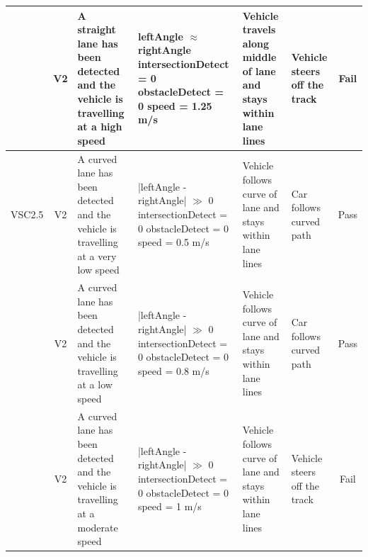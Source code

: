 \documentclass [10pt]{article}
\begin{document}
\begin{longtable}{ | p{ } | p{ } |  p{ } |  p{ } | p{ } | p{ } |  p{ } |}
    \rowcolor{tableCell}\multicolumn{1}{|c|}{VSC2.4} 
    & \multicolumn{1}{c|}{V2}
    & A straight lane has been detected and the vehicle is travelling at a high speed
    & leftAngle $\approx$ rightAngle \newline
    intersectionDetect = 0 \newline
    obstacleDetect = 0 \newline
    speed = 1.25 m/s
    & Vehicle travels along middle of lane and stays within lane lines
    & Vehicle steers off the track
    & \multicolumn{1}{c|}{Fail}\\\hline
    
    \multicolumn{1}{|c|}{VSC2.5} 
    & \multicolumn{1}{c|}{V2}
    & A curved lane has been detected and the vehicle is travelling at a very low speed
    & |leftAngle - rightAngle| $\gg$ 0 \newline
    intersectionDetect = 0 \newline
    obstacleDetect = 0 \newline
    speed = 0.5 m/s
    & Vehicle follows curve of lane and stays within lane lines
    & Car follows curved path
    & \multicolumn{1}{c|}{Pass}\\ \hline
    
    \rowcolor{tableCell}\multicolumn{1}{|c|}{VSC2.6} 
    & \multicolumn{1}{c|}{V2}
    & A curved lane has been detected and the vehicle is travelling at a low speed
     & |leftAngle - rightAngle| $\gg$ 0 \newline
    intersectionDetect = 0 \newline
    obstacleDetect = 0 \newline
    speed = 0.8 m/s
    & Vehicle follows curve of lane and stays within lane lines
    & Car follows curved path
    & \multicolumn{1}{c|}{Pass}\\ \hline
    
     \newpage \hline
     
     
    \multicolumn{1}{|c|}{VSC2.7} 
    & \multicolumn{1}{c|}{V2}
    & A curved lane has been detected and the vehicle is travelling at a moderate speed
     & |leftAngle - rightAngle| $\gg$ 0 \newline
    intersectionDetect = 0 \newline
    obstacleDetect = 0 \newline
    speed = 1 m/s
    & Vehicle follows curve of lane and stays within lane lines
    & Vehicle steers off the track  
    & \multicolumn{1}{c|}{Fail}\\ \hline
    

\end{longtable}
\end{document}
